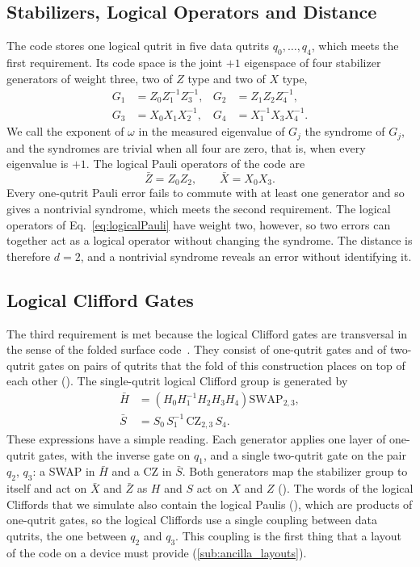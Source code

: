 \subsection{Stabilizers, Logical Operators and Distance}

The code stores one logical qutrit in five data qutrits $q_0, \dots, q_4$, which meets the first requirement. Its code space is the joint $+1$ eigenspace of four stabilizer generators of weight three, two of $Z$ type and two of $X$ type,
\begin{align}
  G_1 &= Z_0 Z_1^{-1} Z_3^{-1}, & G_2 &= Z_1 Z_2 Z_4^{-1}, \label{eq:s1}\\
  G_3 &= X_0 X_1 X_2^{-1}, & G_4 &= X_1^{-1} X_3 X_4^{-1} .
  \label{eq:s4}
\end{align}
We call the exponent of $\omega$ in the measured eigenvalue of $G_j$ the syndrome of $G_j$, and the syndromes are trivial when all four are zero, that is, when every eigenvalue is $+1$. The logical Pauli operators of the code are
\begin{equation}
  \bar Z = Z_0 Z_2, \qquad
  \bar X = X_0 X_3 .
  \label{eq:logicalPauli}
\end{equation}
Every one-qutrit Pauli error fails to commute with at least one generator and so gives a nontrivial syndrome, which meets the second requirement. The logical operators of Eq.~\eqref{eq:logicalPauli} have weight two, however, so two errors can together act as a logical operator without changing the syndrome. The distance is therefore $d = 2$, and a nontrivial syndrome reveals an error without identifying it.

\subsection{Logical Clifford Gates}

The third requirement is met because the logical Clifford gates are transversal in the sense of the folded surface code~\cite{Moussa2016}. They consist of one-qutrit gates and of two-qutrit gates on pairs of qutrits that the fold of this construction places on top of each other (). The single-qutrit logical Clifford group is generated by
\begin{align}
  \bar H &=
  \left( H_0 H_1^{-1} H_2 H_3 H_4 \right) \mathrm{SWAP}_{2,3}, \label{eq:logical_H}\\
  \bar S &= S_0\, S_1^{-1}\, \mathrm{CZ}_{2,3}\, S_4 .
  \label{eq:logical_HS}
\end{align}
These expressions have a simple reading. Each generator applies one layer of one-qutrit gates, with the inverse gate on $q_1$, and a single two-qutrit gate on the pair $q_2$, $q_3$: a SWAP in $\bar H$ and a CZ in $\bar S$. Both generators map the stabilizer group to itself and act on $\bar X$ and $\bar Z$ as $H$ and $S$ act on $X$ and $Z$ (). The words of the logical Cliffords that we simulate also contain the logical Paulis (), which are products of one-qutrit gates, so the logical Cliffords use a single coupling between data qutrits, the one between $q_2$ and $q_3$. This coupling is the first thing that a layout of the code on a device must provide (\autoref{sub:ancilla_layouts}).



